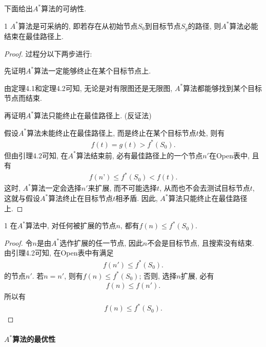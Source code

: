 下面给出$A^*$算法的可纳性.
\begin{mythm}{}{1}
$A^*$算法是可采纳的, 即若存在从初始节点$S_0$到目标节点$S_g$的路径, 则$A^*$算法必能结束在最佳路径上.
\end{mythm}
\begin{proof}
过程分以下两步进行:

先证明$A^*$算法一定能够终止在某个目标节点上.

由定理4.1和定理4.2可知, 无论是对有限图还是无限图, $A^*$算法都能够找到某个目标节点而结束.

再证明$A^*$算法只能终止在最佳路径上. (反证法)

假设$A^*$算法未能终止在最佳路径上, 而是终止在某个目标节点$t$处, 则有
\begin{align}
  f(t)=g(t)>f^*(S_0).
\end{align}
但由引理4.2可知, 在$A^*$算法结束前, 必有最佳路径上的一个节点$n'$在Open表中, 且有
\begin{align}
  f(n’)\leq f^*(S_0)<f(t).
\end{align}
这时, $A^*$算法一定会选择$n'$来扩展, 而不可能选择$t$, 从而也不会去测试目标节点$t$, 这就与假设$A^*$算法终止在目标节点$t$相矛盾. 因此, $A^*$算法只能终止在最佳路径上.
\end{proof}

\begin{myprop}{}{1}
  在$A^*$算法中, 对任何被扩展的节点$n$, 都有$f(n)\leq f^*(S_0)$.
\end{myprop}
\begin{proof}
令$n$是由$A^*$选作扩展的任一节点, 因此$n$不会是目标节点, 且搜索没有结束. 由引理4.2可知, 在Open表中有满足
\begin{align}
  f(n')\leq f^*(S_0).
\end{align}
的节点$n'$. 若$n=n'$, 则有$f(n)\leq f^*(S_0)$; 否则, 选择$n$扩展, 必有
\begin{align}
  f(n) \leq f(n').
\end{align}
所以有
\begin{align}
  f(n)\leq f^*(S_0).
\end{align}
\end{proof}
\paragraph{$A^*$算法的最优性}~{}

